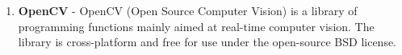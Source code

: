 \begin{enumerate}
\begin{itemize}
	\end{itemize}

	\item \textbf{OpenCV} - OpenCV (Open Source Computer Vision) is a library of programming functions mainly aimed at real-time computer vision. The library is cross-platform and free for use under the open-source BSD license.
\end{enumerate}